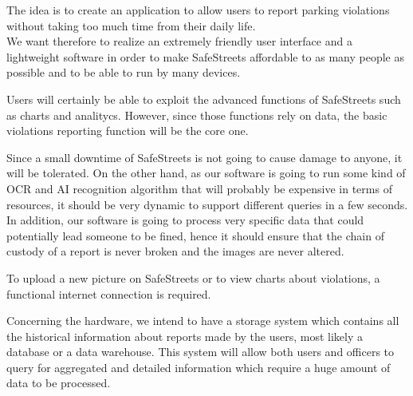 \setlength{\parskip}{1em}
The idea is to create an application to allow users to report parking violations without taking too much time from their daily life.
\\We want therefore to realize an extremely friendly user interface and a lightweight software in order to make SafeStreets affordable to as many people as possible and to be able to run by many devices.

Users will certainly be able to exploit the advanced functions of SafeStreets such as charts and analitycs. However, since those functions rely on data, the basic violations reporting function will be the core one.

Since a small downtime of SafeStreets is not going to cause damage to anyone, it will be tolerated. On the other hand, as our software is going to run some kind of OCR and AI recognition algorithm that will probably be expensive in terms of resources, it should be very dynamic to support different queries in a few seconds.
\\In addition, our software is going to process very specific data that could potentially lead someone to be fined, hence it should ensure that the chain of custody of a report is never broken and the images are never altered.

To upload a new picture on SafeStreets or to view charts about violations, a functional internet connection is required.

Concerning the hardware, we intend to have a storage system which contains all the historical information about reports made by the users, most likely a database or a data warehouse. This system will allow both users and officers to query for aggregated and detailed information which require a huge amount of data to be processed.
\clearpage